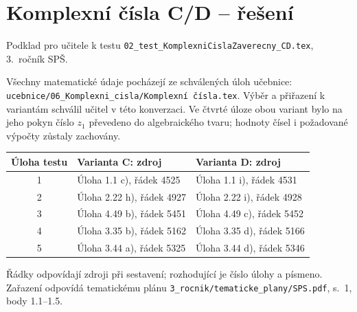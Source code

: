 \documentclass[a4paper,10pt]{article}
\begin{document}
\section*{Komplexní čísla C/D -- řešení}
Podklad pro učitele k testu \texttt{02\_test\_KomplexniCislaZaverecny\_CD.tex}, 3.~ročník SPŠ.

Všechny matematické údaje pocházejí ze schválených úloh učebnice:\\
\texttt{ucebnice/06\_Komplexni\_cisla/Komplexní čísla.tex}.
Výběr a přiřazení k variantám schválil učitel v této konverzaci.
Ve čtvrté úloze obou variant bylo na jeho pokyn číslo $z_1$ převedeno
do algebraického tvaru; hodnoty čísel i požadované výpočty zůstaly zachovány.

\begin{center}
\begin{tabular}{c|ll}
Úloha testu & Varianta C: zdroj & Varianta D: zdroj\\ \hline
1 & Úloha 1.1 c), řádek 4525 & Úloha 1.1 i), řádek 4531\\
2 & Úloha 2.22 h), řádek 4927 & Úloha 2.22 i), řádek 4928\\
3 & Úloha 4.49 b), řádek 5451 & Úloha 4.49 c), řádek 5452\\
4 & Úloha 3.35 b), řádek 5162 & Úloha 3.35 d), řádek 5166\\
5 & Úloha 3.44 a), řádek 5325 & Úloha 3.44 d), řádek 5346
\end{tabular}
\end{center}
Řádky odpovídají zdroji při sestavení; rozhodující je číslo úlohy a písmeno.
Zařazení odpovídá tematickému plánu
\texttt{3\_rocnik/tematicke\_plany/SPS.pdf}, s.~1, body 1.1--1.5.
\end{document}

